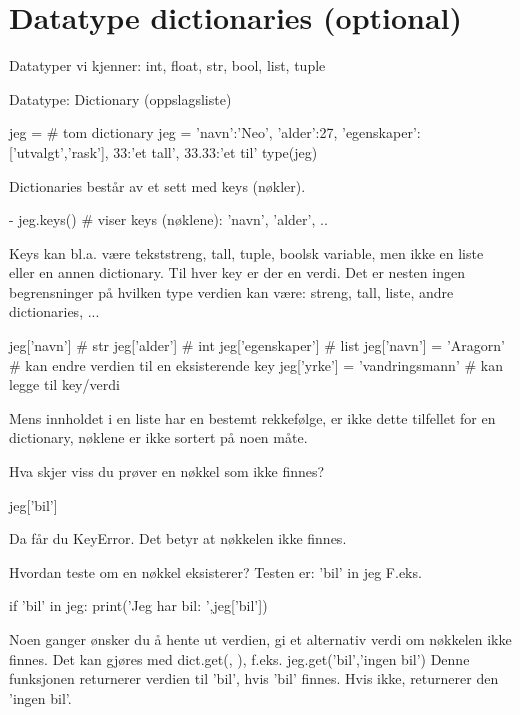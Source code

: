 {\section{Datatype dictionaries (optional)}

Datatyper vi kjenner: int, float, str, bool, list, tuple 

Datatype: Dictionary (oppslagsliste)

\begin{usncodebox}
jeg = {}  # tom dictionary
jeg = {'navn':'Neo', 'alder':27, 'egenskaper':['utvalgt','rask'], 33:'et tall', 33.33:'et til'} 
type(jeg) 
\end{usncodebox}

Dictionaries består av et sett med keys (nøkler).
\begin{usncodebox}
- jeg.keys()  # viser keys (nøklene): 'navn', 'alder', ..
\end{usncodebox}

Keys kan bl.a. være tekststreng, tall, tuple, boolsk variable, men ikke en liste eller en annen dictionary. Til hver key er der en verdi.  Det er nesten ingen begrensninger på hvilken type verdien kan være: streng, tall, liste, andre dictionaries, ...

\begin{usncodebox}
jeg['navn']         # str
jeg['alder']        # int
jeg['egenskaper']   # list
jeg['navn'] = 'Aragorn'        # kan endre verdien til en eksisterende key
jeg['yrke'] = 'vandringsmann'  # kan legge til key/verdi 
\end{usncodebox}

Mens innholdet i en liste har en bestemt rekkefølge, er ikke dette tilfellet for en dictionary, nøklene er ikke sortert på noen måte.

Hva skjer viss du prøver en nøkkel som ikke finnes?
\begin{usncodebox}
jeg['bil']
\end{usncodebox}

Da får du KeyError. Det betyr at nøkkelen ikke finnes.

Hvordan teste om en nøkkel eksisterer? Testen er: 'bil' in jeg
F.eks.
\begin{usncodebox}
if 'bil' in jeg:
   print('Jeg har bil: ',jeg['bil'])
\end{usncodebox}

Noen ganger ønsker du å hente ut verdien, gi et alternativ verdi om nøkkelen ikke finnes. Det kan gjøres med dict.get(, ), f.eks. jeg.get('bil','ingen bil') Denne funksjonen returnerer verdien til 'bil', hvis 'bil' finnes. Hvis ikke, returnerer den 'ingen bil'.

}
